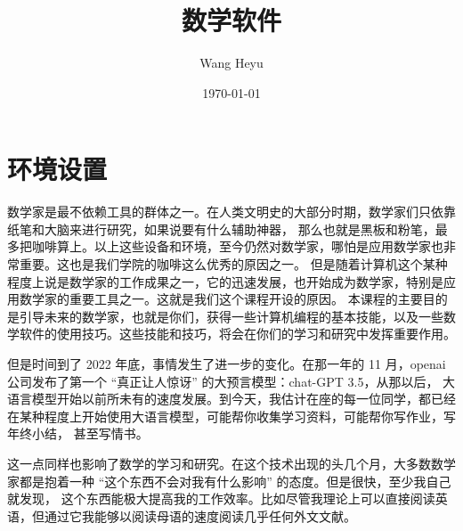 \documentclass{ctexbook}
\title{数学软件}
\author{Wang Heyu}
\date{\today}
\numberwithin{theorem}{chapter}
\begin{document}
  
\maketitle  

\chapter{环境设置}

数学家是最不依赖工具的群体之一。在人类文明史的大部分时期，数学家们只依靠纸笔和大脑来进行研究，如果说要有什么辅助神器，
那么也就是黑板和粉笔，最多把咖啡算上。以上这些设备和环境，至今仍然对数学家，哪怕是应用数学家也非常重要。这也是我们学院的咖啡这么优秀的原因之一。
但是随着计算机这个某种程度上说是数学家的工作成果之一，它的迅速发展，也开始成为数学家，特别是应用数学家的重要工具之一。这就是我们这个课程开设的原因。
本课程的主要目的是引导未来的数学家，也就是你们，获得一些计算机编程的基本技能，以及一些数学软件的使用技巧。这些技能和技巧，将会在你们的学习和研究中发挥重要作用。

但是时间到了 2022 年底，事情发生了进一步的变化。在那一年的 11 月，openai 公司发布了第一个 ``真正让人惊讶'' 的大预言模型：chat-GPT 3.5，从那以后，
大语言模型开始以前所未有的速度发展。到今天，我估计在座的每一位同学，都已经在某种程度上开始使用大语言模型，可能帮你收集学习资料，可能帮你写作业，写年终小结，
甚至写情书。

这一点同样也影响了数学的学习和研究。在这个技术出现的头几个月，大多数数学家都是抱着一种 ``这个东西不会对我有什么影响'' 的态度。但是很快，至少我自己就发现，
这个东西能极大提高我的工作效率。比如尽管我理论上可以直接阅读英语，但通过它我能够以阅读母语的速度阅读几乎任何外文文献。
\end{document}

